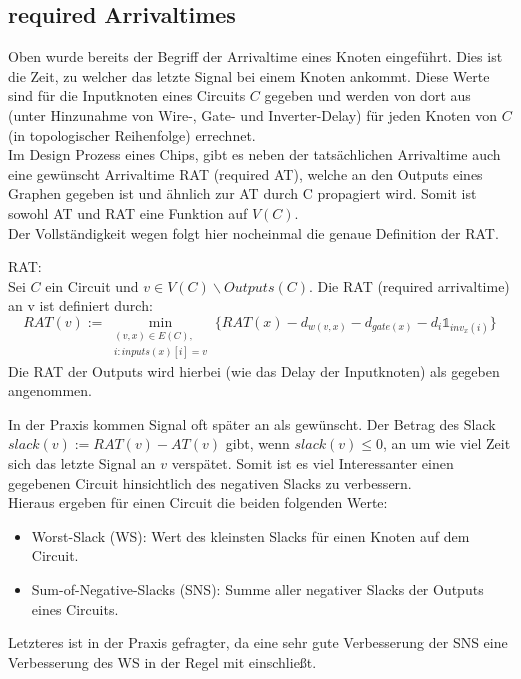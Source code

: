 \documentclass[11pt, a4paper, german]{article}
\begin{document}
\subsection{required Arrivaltimes}
\label{subsec:rat}
Oben wurde bereits der Begriff der Arrivaltime eines Knoten eingeführt. Dies ist die Zeit, zu welcher das letzte Signal bei einem Knoten ankommt. Diese Werte sind für die Inputknoten eines Circuits $C$ gegeben und werden von dort aus (unter Hinzunahme von Wire-, Gate- und Inverter-Delay) für jeden Knoten von $C$ (in topologischer Reihenfolge) errechnet.\\
Im Design Prozess eines Chips, gibt es neben der tatsächlichen Arrivaltime auch eine  gewünscht Arrivaltime RAT (required AT), welche an den Outputs eines Graphen gegeben ist und ähnlich zur AT durch C propagiert wird. Somit ist sowohl AT und RAT eine Funktion auf $V(C)$. \\
Der Vollständigkeit wegen folgt hier nocheinmal die genaue Definition der RAT.\\

\begin{definition}{RAT:}\\
	Sei $C$ ein Circuit und $v \in V(C)\backslash  Outputs(C)$. Die RAT (required arrivaltime) an v ist definiert durch:
	\[   RAT(v) := \min\limits_{ \substack{(v,x)\in E(C), \\ i: inputs(x)[i] = v }} \{ RAT(x) - d_{w(v,x)} - d_{gate(x)} - d_{i} \mathbb{1}_{inv_x(i)} \}\] 
	Die RAT der Outputs wird hierbei (wie das Delay der Inputknoten) als gegeben angenommen. 
\end{definition}

In der Praxis kommen Signal oft später an als gewünscht. Der Betrag des Slack $slack(v) := RAT(v) - AT(v)$ gibt, wenn $slack(v) \leq 0 $, an um wie viel Zeit sich das letzte Signal an $v$ verspätet. Somit ist es viel Interessanter einen gegebenen Circuit hinsichtlich des negativen Slacks zu verbessern. \\
Hieraus ergeben für einen Circuit die beiden folgenden Werte: 
\begin{itemize}
	\item Worst-Slack (WS): Wert des kleinsten Slacks für einen Knoten auf dem Circuit.
	\item Sum-of-Negative-Slacks (SNS): Summe aller negativer Slacks der Outputs eines Circuits.
\end{itemize}
Letzteres ist in der Praxis gefragter, da eine sehr gute Verbesserung der SNS eine Verbesserung des WS in der Regel mit einschließt. \\
\end{document}
